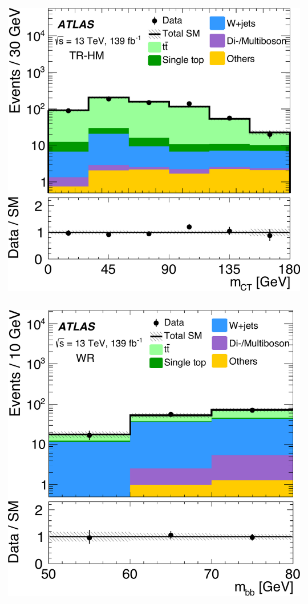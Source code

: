 \begin{figure}
\begin{subfigure}[b]{0.5\linewidth}
		\centering\includegraphics[width=0.85\textwidth]{fig_02c_yellow}
	\end{subfigure}\hfill
	\begin{subfigure}[b]{0.5\linewidth}
		\centering\includegraphics[width=0.85\textwidth]{fig_02d_yellow}
	\end{subfigure}\hfill
	\par\medskip
	\begin{subfigure}[b]{0.5\linewidth}

\end{subfigure}
\end{figure}
